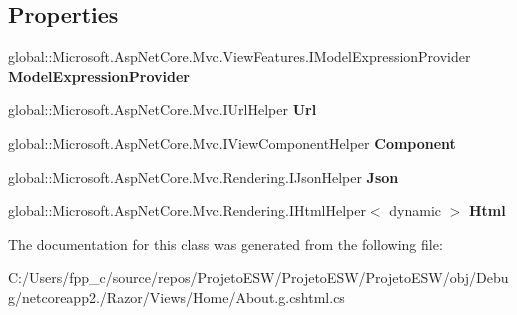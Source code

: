 \subsection*{Properties}
\begin{DoxyCompactItemize}
\item 
\mbox{\label{class_asp_net_core_1_1_views___home___about_a6fdbaace0fe08f0cabf6b079aa98e90d}} 
global\+::\+Microsoft.\+Asp\+Net\+Core.\+Mvc.\+View\+Features.\+I\+Model\+Expression\+Provider {\bfseries Model\+Expression\+Provider}
\item 
\mbox{\label{class_asp_net_core_1_1_views___home___about_a15c4bc42184c95d71689264848166418}} 
global\+::\+Microsoft.\+Asp\+Net\+Core.\+Mvc.\+I\+Url\+Helper {\bfseries Url}
\item 
\mbox{\label{class_asp_net_core_1_1_views___home___about_aa9af308c80824026cfc278afc134b805}} 
global\+::\+Microsoft.\+Asp\+Net\+Core.\+Mvc.\+I\+View\+Component\+Helper {\bfseries Component}
\item 
\mbox{\label{class_asp_net_core_1_1_views___home___about_afeb038518efee544b41b59253cc30f55}} 
global\+::\+Microsoft.\+Asp\+Net\+Core.\+Mvc.\+Rendering.\+I\+Json\+Helper {\bfseries Json}
\item 
\mbox{\label{class_asp_net_core_1_1_views___home___about_aea50cb55a075ca456a29278c8bd92a34}} 
global\+::\+Microsoft.\+Asp\+Net\+Core.\+Mvc.\+Rendering.\+I\+Html\+Helper$<$ dynamic $>$ {\bfseries Html}
\end{DoxyCompactItemize}


The documentation for this class was generated from the following file\+:\begin{DoxyCompactItemize}
\item 
C\+:/\+Users/fpp\+\_\+c/source/repos/\+Projeto\+E\+S\+W/\+Projeto\+E\+S\+W/\+Projeto\+E\+S\+W/obj/\+Debug/netcoreapp2./\+Razor/\+Views/\+Home/About.\+g.\+cshtml.\+cs\end{DoxyCompactItemize}
